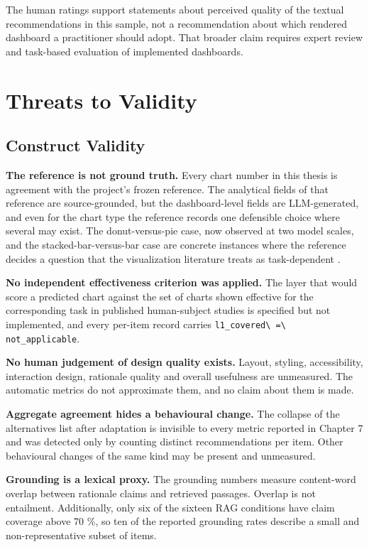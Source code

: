 The human ratings support statements about perceived quality of the textual recommendations in this sample, not a recommendation about which rendered dashboard a practitioner should adopt. That broader claim requires expert review and task-based evaluation of implemented dashboards.

\section{Threats to Validity}

\subsection{Construct Validity}

\textbf{The reference is not ground truth.} Every chart number in this thesis is agreement with the project's frozen reference. The analytical fields of that reference are source-grounded, but the dashboard-level fields are LLM-generated, and even for the chart type the reference records one defensible choice where several may exist. The donut-versus-pie case, now observed at two model scales, and the stacked-bar-versus-bar case are concrete instances where the reference decides a question that the visualization literature treats as task-dependent \cite{saket2019taskbased,kim2018taskdata}.

\textbf{No independent effectiveness criterion was applied.} The layer that would score a predicted chart against the set of charts shown effective for the corresponding task in published human-subject studies is specified but not implemented, and every per-item record carries \nolinkurl{l1_covered\ =\ not_applicable}.

\textbf{No human judgement of design quality exists.} Layout, styling, accessibility, interaction design, rationale quality and overall usefulness are unmeasured. The automatic metrics do not approximate them, and no claim about them is made.

\textbf{Aggregate agreement hides a behavioural change.} The collapse of the alternatives list after adaptation is invisible to every metric reported in Chapter 7 and was detected only by counting distinct recommendations per item. Other behavioural changes of the same kind may be present and unmeasured.

\textbf{Grounding is a lexical proxy.} The grounding numbers measure content-word overlap between rationale claims and retrieved passages. Overlap is not entailment. Additionally, only six of the sixteen RAG conditions have claim coverage above 70 \%, so ten of the reported grounding rates describe a small and non-representative subset of items.

